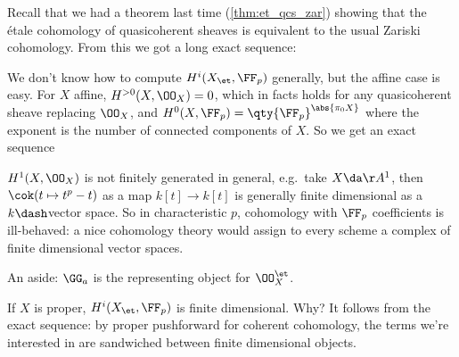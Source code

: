 Recall that we had a theorem last time (\cref{thm:et_qcs_zar}) showing
that the étale cohomology of quasicoherent sheaves is equivalent to the
usual Zariski cohomology. From this we got a long exact sequence:

\begin{center}
\end{center}

We don't know how to compute \(H^i(X_\et, \FF_p)\) generally, but the
affine case is easy. For \(X\) affine, \(H^{>0}(X, \OO_X) = 0\), which
in facts holds for any quasicoherent sheave replacing \(\OO_X\), and
\(H^0(X, \FF_p) = \qty{\FF_p}^{\abs {\pi_0 X} }\) where the exponent is
the number of connected components of \(X\). So we get an exact sequence

\begin{center}
\end{center}

\begin{remark}

\(H^1(X, \OO_X)\) is not finitely generated in general, e.g.~take
\(X \da \AA^1\), then \(\cok(t\mapsto t^p - t)\) as a map
\(k[t] \to k[t]\) is generally finite dimensional as a \(k\dash\)vector
space. So in characteristic \(p\), cohomology with \(\FF_p\)
coefficients is ill-behaved: a nice cohomology theory would assign to
every scheme a complex of finite dimensional vector spaces.

\end{remark}

\begin{remark}

An aside: \(\GG_a\) is the representing object for \(\OO_X^\et\).

\end{remark}

\begin{remark}

If \(X\) is proper, \(H^i(X_\et, \FF_p)\) is finite dimensional. Why? It
follows from the exact sequence: by proper pushforward for coherent
cohomology, the terms we're interested in are sandwiched between finite
dimensional objects.

\end{remark}

